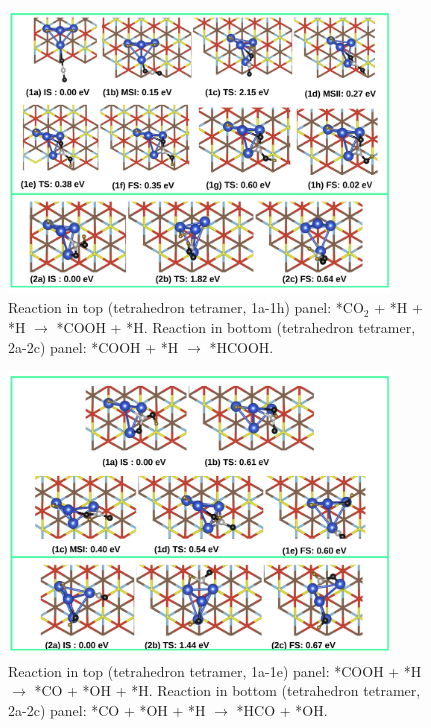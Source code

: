 \begin{figure}
  \begin{center}
    \includegraphics[width=0.9\textwidth]{./Appendix3/figures_si/p_117.jpg}
  \end{center}
    \caption{Reaction in top (tetrahedron tetramer, 1a-1h) panel: *CO$_2$ + *H  + *H $\rightarrow$ *COOH + *H. Reaction in bottom (tetrahedron tetramer, 2a-2c) panel: *COOH + *H $\rightarrow$ *HCOOH.  }
  \label{fig:si-116}
\end{figure}

\begin{figure}
  \begin{center}
    \includegraphics[width=0.9\textwidth]{./Appendix3/figures_si/p_118.jpg}
  \end{center}
    \caption{Reaction in top (tetrahedron tetramer, 1a-1e) panel: *COOH + *H $\rightarrow$ *CO + *OH + *H. Reaction in bottom (tetrahedron tetramer, 2a-2c) panel: *CO + *OH + *H $\rightarrow$ *HCO + *OH. }
  \label{fig:si-117}
\end{figure}

